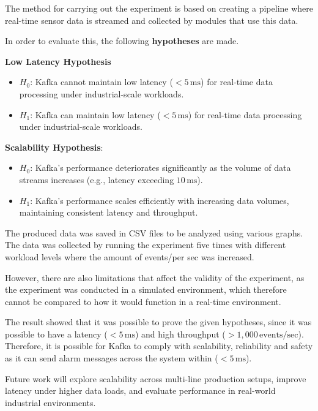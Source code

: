 The method for carrying out the experiment is based on creating a pipeline where real-time sensor data is streamed and collected by modules that use this data.

In order to evaluate this, the following \textbf{hypotheses} are made.

\textbf{Low Latency Hypothesis}
\begin{itemize}
    \item \( H_0 \): Kafka cannot maintain low latency (\(< 5 \, \text{ms}\)) for real-time data processing under industrial-scale workloads.
    \item \( H_1 \): Kafka can maintain low latency (\(< 5 \, \text{ms}\)) for real-time data processing under industrial-scale workloads.
\end{itemize}
\textbf{Scalability Hypothesis}:
\begin{itemize}
    \item \( H_0 \): Kafka’s performance deteriorates significantly as the volume of data streams increases (e.g., latency exceeding \(10 \, \text{ms}\)).
    \item \( H_1 \): Kafka’s performance scales efficiently with increasing data volumes, maintaining consistent latency and throughput.
\end{itemize}
The produced data was saved in CSV files to be analyzed using various graphs. The data was collected by running the experiment five times with different workload levels where the amount of events/per sec was increased.


However, there are also limitations that affect the validity of the experiment, as the experiment was conducted in a simulated environment, which therefore cannot be compared to how it would function in a real-time environment.

The result showed that it was possible to prove the given hypotheses, since it was possible to have a latency ($<5\,\text{ms}$) and high throughput ($>1{,}000\,\text{events/sec}$). Therefore, it is possible for Kafka to comply with scalability, reliability and safety as it can send alarm messages across the system within ($<5\,\text{ms}$).

Future work will explore scalability across multi-line production setups, improve latency under higher data loads, and evaluate performance in real-world industrial environments.




